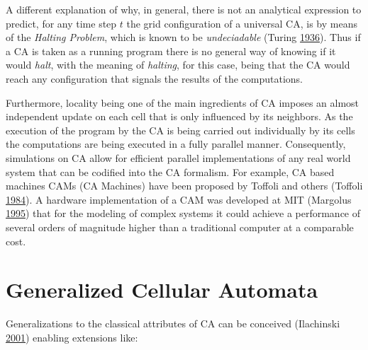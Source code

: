 \documentclass[
  12pt,
  openany]{book}
\begin{document}
A different explanation of why, in general, there is not an analytical expression to predict, for any time step \(t\) the grid configuration of a universal CA, is by means of the \emph{Halting Problem}, which is known to be \emph{undeciadable} (Turing \protect\hyperlink{ref-turing1936computable}{1936}). Thus if a CA is taken as a running program there is no general way of knowing if it would \emph{halt}, with the meaning of \emph{halting}, for this case, being that the CA would reach any configuration that signals the results of the computations.

Furthermore, locality being one of the main ingredients of CA imposes an almost independent update on each cell that is only influenced by its neighbors. As the execution of the program by the CA is being carried out individually by its cells the computations are being executed in a fully parallel manner. Consequently, simulations on CA allow for efficient parallel implementations of any real world system that can be codified into the CA formalism. For example, CA based machines CAMs (CA Machines) have been proposed by Toffoli and others (Toffoli \protect\hyperlink{ref-toffoli1984cam}{1984}). A hardware implementation of a CAM was developed at MIT (Margolus \protect\hyperlink{ref-margolus1995cam}{1995}) that for the modeling of complex systems it could achieve a performance of several orders of magnitude higher than a traditional computer at a comparable cost.

\hypertarget{generalized-cellular-automata}{%
\section{Generalized Cellular Automata}\label{generalized-cellular-automata}}

Generalizations to the classical attributes of CA can be conceived (Ilachinski \protect\hyperlink{ref-ilachinski2001cellular}{2001}) enabling extensions like:
\end{document}
